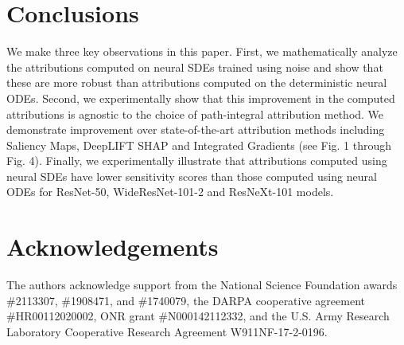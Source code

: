 \documentclass[10pt,twocolumn]{article}
\begin{document}
\section{Conclusions}

We make three key observations in this paper. First, we mathematically analyze the attributions computed on neural SDEs trained using noise and show that these are more robust than attributions computed on the deterministic neural ODEs. Second, we experimentally show that this improvement in the computed attributions is agnostic to the choice of path-integral attribution method. We demonstrate improvement over state-of-the-art attribution methods including Saliency Maps, DeepLIFT SHAP and Integrated Gradients (see Fig. 1 through Fig. 4). Finally, we experimentally illustrate that attributions computed using neural SDEs have lower sensitivity scores than those computed using neural ODEs for ResNet-50, WideResNet-101-2 and ResNeXt-101 models.

\section{Acknowledgements}

The authors acknowledge support from the National Science Foundation awards \#2113307, \#1908471, and \#1740079, the DARPA cooperative agreement \#HR00112020002, ONR grant \#N000142112332, and the U.S. Army Research Laboratory Cooperative Research Agreement W911NF-17-2-0196.

\printbibliography
\end{document}
